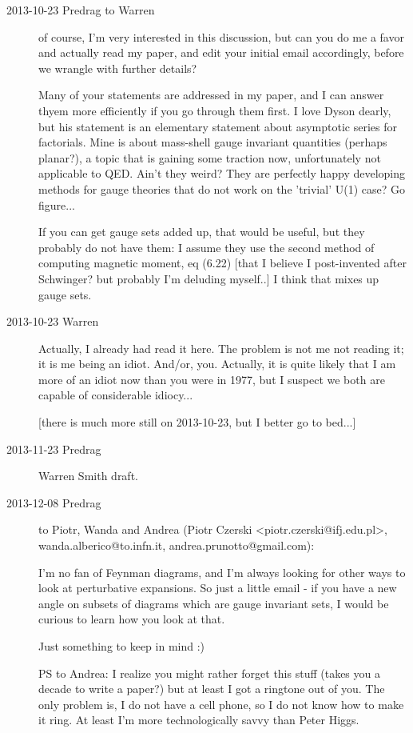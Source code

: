 \begin{description}
\item[2013-10-23 Predrag to Warren]
of course, I'm very interested in this discussion, but can you do me a
favor and actually read my paper, and edit your initial email
accordingly, before we wrangle with further details?

Many of your statements are addressed in my paper, and I can answer thyem
more efficiently if you go through them first. I love Dyson dearly, but
his statement is an elementary statement about asymptotic series for
factorials. Mine is about mass-shell gauge invariant quantities (perhaps
planar?), a topic that is gaining some traction now, unfortunately not
applicable to QED. Ain't they weird? They are perfectly happy developing
methods for gauge theories that do not work on the 'trivial' U(1) case?
Go figure...

If you can get gauge sets added up, that would be useful, but they
probably do not have them: I assume they  use the second method of
computing magnetic moment,
{eq (6.22)}  [that I believe I post-invented
after Schwinger? but probably I'm deluding myself..] I think that mixes up
gauge sets.

\item[2013-10-23 Warren]
Actually, I already had read it
{here}.
The problem is not me not reading it; it is me being an idiot.  And/or, you.
Actually, it is quite likely that I am more of an idiot now than you
were in 1977, but I suspect we both are capable of considerable
idiocy...

[there is much more still on 2013-10-23, but I better go to bed...]

\item[2013-11-23  Predrag]
 {Warren Smith} draft.

\item[2013-12-08  Predrag] to Piotr, Wanda and Andrea
(Piotr Czerski <piotr.czerski@ifj.edu.pl>,
 wanda.alberico@to.infn.it,
 andrea.prunotto@gmail.com):

I'm no fan of Feynman diagrams, and I'm always looking
for other ways to look at perturbative expansions. So just a little email
- if you have a new angle on subsets of diagrams which are gauge
invariant sets, I would be curious to learn how you look at that.

Just something to keep in mind :)

PS to Andrea: I realize you might rather forget this stuff (takes you a
decade to write a paper?) but at least I got a ringtone out of you. The
only problem is, I do not have a cell phone, so I do not know how to make
it ring. At least I'm more technologically savvy than
{Peter Higgs}.


\end{description}

